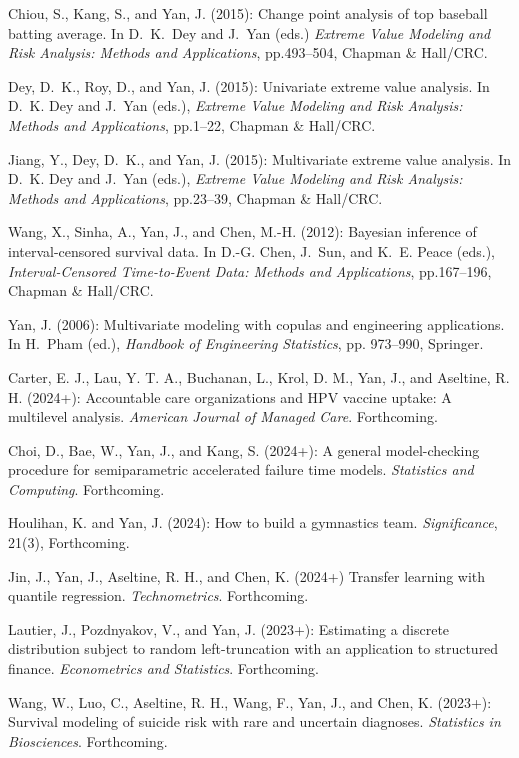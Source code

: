 \documentclass[Statistics]{vita}
\begin{document}
\begin{vita}
\begin{Publications}
\begin{BookChapters}
  \item *Chiou, S., Kang, S., and Yan, J. (2015): Change point analysis of top baseball batting average. In D.~K.~Dey and J.~Yan (eds.) {\em Extreme Value Modeling and Risk Analysis: Methods and Applications\/}, pp.493--504, Chapman \& Hall/CRC.
  \item Dey, D.~K., Roy, D., and Yan, J. (2015): Univariate extreme value analysis. In D.~K. Dey and J.~Yan (eds.), {\em Extreme Value Modeling and Risk Analysis: Methods and Applications\/}, pp.1--22, Chapman \& Hall/CRC.
  \item *Jiang, Y., Dey, D.~K., and Yan, J. (2015): Multivariate extreme value analysis. In D.~K. Dey and J.~Yan (eds.), {\em Extreme Value Modeling and Risk Analysis: Methods and Applications\/}, pp.23--39, Chapman \& Hall/CRC.
  \item *Wang, X., Sinha, A., Yan, J., and Chen, M.-H. (2012): Bayesian inference of interval-censored survival data. In D.-G. Chen, J.~Sun, and  K.~E. Peace (eds.), {\em Interval-Censored Time-to-Event Data: {M}ethods and Applications\/}, pp.167--196, Chapman \& Hall/CRC.
  \item Yan, J. (2006): Multivariate modeling with copulas and engineering applications. In H.~Pham (ed.), {\em Handbook of Engineering Statistics\/}, pp. 973--990, Springer.
  \end{BookChapters}
  \begin{RefereedJournalArticles}
  \item Carter, E. J., Lau, Y. T. A., Buchanan, L., Krol, D. M., Yan, J., and Aseltine, R. H. (2024+): Accountable care organizations and {HPV} vaccine uptake: A multilevel analysis. {\em American Journal of Managed Care\/}. Forthcoming.
  \item Choi, D., Bae, W., Yan, J., and Kang, S. (2024+): A general model-checking procedure for semiparametric accelerated failure time models. {\em Statistics and Computing\/}. Forthcoming.
  \item *Houlihan, K. and Yan, J. (2024): How to build a gymnastics team. {\em Significance\/}, 21(3), Forthcoming.
  \item *Jin, J., Yan, J., Aseltine, R. H., and Chen, K. (2024+) Transfer learning with quantile regression. {\em Technometrics\/}. Forthcoming.
  \item *Lautier, J., Pozdnyakov, V., and Yan, J. (2023+): Estimating a discrete distribution subject to random left-truncation with an application to structured finance. {\em Econometrics and Statistics\/}. Forthcoming. 
  \item *Wang, W., Luo, C., Aseltine, R. H., Wang, F., Yan, J., and Chen, K. (2023+): Survival modeling of suicide risk with rare and uncertain diagnoses. {\em Statistics in Biosciences\/}. Forthcoming.

\end{RefereedJournalArticles}
\end{Publications}
\end{vita}
\end{document}
